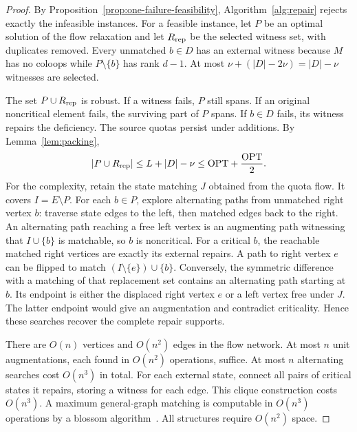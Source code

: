 \documentclass[11pt]{article}
\theoremstyle{definition}
\theoremstyle{remark}\newtheorem{remark}[theorem]{Remark}
\newcommand{\OPT}{\mathrm{OPT}}
\begin{document}
\begin{proof}
By Proposition~\ref{prop:one-failure-feasibility}, Algorithm~\ref{alg:repair}
rejects exactly the infeasible instances. For a feasible instance, let
$P$ be an optimal solution of the flow relaxation and let $R_{\rm rep}$
be the selected witness set, with duplicates removed. Every unmatched
$b\in D$ has an external witness because $M$ has no coloops while
$P\setminus\{b\}$ has rank $d-1$. At most
$\nu+(|D|-2\nu)=|D|-\nu$ witnesses are selected.

The set $P\cup R_{\rm rep}$ is robust. If a witness fails, $P$ still spans. If an
original noncritical element fails, the surviving part of $P$ spans. If
$b\in D$ fails, its witness repairs the deficiency. The source quotas
persist under additions. By Lemma~\ref{lem:packing},
\[
 |P\cup R_{\rm rep}|\le L+|D|-\nu\le\OPT+\frac{\OPT}{2}.
\]
For the complexity, retain the state matching $J$ obtained from the quota
flow. It covers $I=E\setminus P$. For each $b\in P$, explore alternating
paths from unmatched right vertex $b$: traverse state edges to the left,
then matched edges back to the right. An alternating path reaching a free left vertex is
an augmenting path witnessing that $I\cup\{b\}$ is matchable, so
$b$ is noncritical. For a critical $b$, the reachable matched right
vertices are exactly its external repairs. A path to right vertex $e$
can be flipped to match $(I\setminus\{e\})\cup\{b\}$. Conversely, the
symmetric difference with a matching of that replacement set contains
an alternating path starting at $b$. Its endpoint is either the displaced
right vertex $e$ or a left vertex free under $J$. The latter endpoint
would give an augmentation and contradict criticality.
Hence these searches recover the complete repair supports.

There are $O(n)$ vertices and $O(n^2)$ edges in the flow network. At most
$n$ unit augmentations, each found in $O(n^2)$ operations, suffice. At most
$n$ alternating searches cost $O(n^3)$ in total. For each external state,
connect all pairs of critical states it repairs, storing a witness for each
edge. This clique construction costs $O(n^3)$. A maximum general-graph
matching is computable in $O(n^3)$ operations by a blossom algorithm~\cite{Gabow,LP}. All structures require $O(n^2)$ space.
\end{proof}
\end{document}
